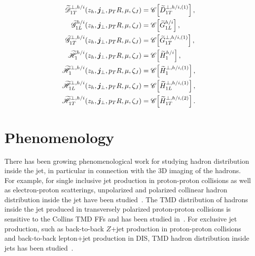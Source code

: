 \documentclass[a4paper, 11 pt]{article}
\begin{document}
\begin{align}
\widetilde{\mathscr{D}}_{1T}^{\perp, h/i} \pqty{z_h, \boldsymbol{j}_{\perp}, p_T R,  \mu, \zeta_J}
& =
\mathscr{C} \bqty{\widetilde{D}_{1T}^{\perp, h/i, (1)}}
\, , \\
\widetilde{\mathscr{G}}_{1L}^{h/i} \pqty{z_h, \boldsymbol{j}_{\perp}, p_T R,  \mu, \zeta_J}
& =
\mathscr{C} \bqty{\widetilde{G}_{1L}^{h/i}}
\, , \label{e.G_1L}\\
\widetilde{\mathscr{G}}_{1T}^{\perp, h/i} \pqty{z_h, \boldsymbol{j}_{\perp}, p_T R,  \mu, \zeta_J}
& =
\mathscr{C} \bqty{\widetilde{G}_{1T}^{\perp, h/i, (1)}}
\, , \\
\widetilde{\mathscr{H}}_1^{h/i} \pqty{z_h, \boldsymbol{j}_{\perp}, p_T R,  \mu, \zeta_J}
& =
\mathscr{C} \bqty{\widetilde{H}_{1}^{h/i}}
\, , \\
\widetilde{\mathscr{H}}_{1}^{\perp, h/i} \pqty{z_h, \boldsymbol{j}_{\perp}, p_T R,  \mu, \zeta_J}
& =
\mathscr{C} \bqty{\widetilde{H}_{1}^{\perp, h/i, (1)}}
\, , \\
\widetilde{\mathscr{H}}_{1L}^{\perp, h/i} \pqty{z_h, \boldsymbol{j}_{\perp}, p_T R,  \mu, \zeta_J}
& =
\mathscr{C} \bqty{\widetilde{H}_{1L}^{\perp, h/i, (1)}}
\, , \\
\widetilde{\mathscr{H}}_{1T}^{\perp, h/i} \pqty{z_h, \boldsymbol{j}_{\perp}, p_T R,  \mu, \zeta_J}
& =
\mathscr{C} \bqty{\widetilde{H}_{1T}^{\perp, h/i, (2)}}
\, .
\end{align}


\section{Phenomenology}
\label{s.phenomenology}
There has been growing phenomenological work for studying hadron distribution inside the jet, in particular in connection with the 3D imaging of the hadrons. For example, for single inclusive jet production in proton-proton collisions as well as electron-proton scatterings, unpolarized and polarized collinear hadron distribution inside the jet have been studied~\cite{Kaufmann:2015hma,Kang:2016ehg,Kang:2020xyq,Zhao:2023lav}. The TMD distribution of hadrons inside the jet produced in transversely polarized proton-proton collisions is sensitive to the Collins TMD FFs and has been studied in~\cite{Kang:2017btw}. For exclusive jet production, such as back-to-back $Z$+jet production in proton-proton collisions and back-to-back lepton+jet production in DIS, TMD hadron distribution inside jets has been studied~\cite{Kang:2019ahe,Kang:2021kpt,Kang:2021ffh,Arratia:2022oxd,Arratia:2020nxw}. 
\end{document}
